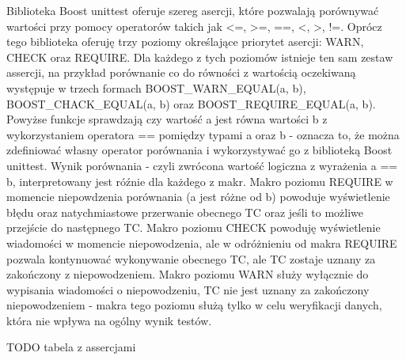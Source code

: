 Biblioteka Boost unittest oferuje szereg asercji, które pozwalają porównywać wartości przy pomocy operatorów takich jak <=, >=, ==, <, >, !=. Oprócz tego biblioteka oferuję trzy poziomy określające priorytet asercji: WARN, CHECK oraz REQUIRE. Dla każdego z tych poziomów istnieje ten sam zestaw assercji, na przykład porównanie co do równości z wartością oczekiwaną występuje w trzech formach BOOST_WARN_EQUAL(a, b), BOOST_CHACK_EQUAL(a, b) oraz BOOST_REQUIRE_EQUAL(a, b).
Powyżse funkcje sprawdzają czy wartość a jest równa wartości b z wykorzystaniem operatora == pomiędzy typami a oraz b - oznacza to, że można zdefiniować własny operator porównania i wykorzystywać go z biblioteką Boost unittest. 
Wynik porównania - czyli zwrócona wartość logiczna z wyrażenia a == b, interpretowany jest róźnie dla każdego z makr. Makro poziomu REQUIRE w momencie niepowdzenia porównania (a jest różne od b) powoduje wyświetlenie błędu oraz natychmiastowe przerwanie obecnego TC oraz jeśli to możliwe przejście do następnego TC.
Makro poziomu CHECK powoduję wyświetlenie wiadomości w momencie niepowodzenia, ale w odróżnieniu od makra REQUIRE pozwala kontynuować wykonywanie obecnego TC, ale TC zostaje uznany za zakończony z niepowodzeniem.
Makro poziomu WARN służy wyłącznie do wypisania wiadomości o niepowodzeniu, TC nie jest uznany za zakończony niepowodzeniem - makra tego poziomu służą tylko w celu weryfikacji danych, która nie wpływa na ogólny wynik testów.

TODO tabela z assercjami

